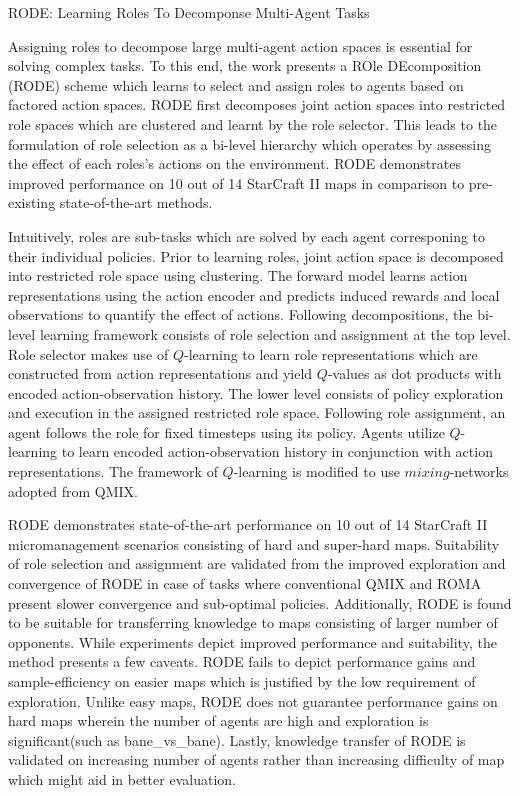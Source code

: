\documentclass[11pt,letterpaper]{article}
\begin{document}
\begin{center}
  \large{RODE: Learning Roles To Decomponse Multi-Agent Tasks}
\end{center}

Assigning roles to decompose large multi-agent action spaces is essential for solving complex tasks. To this end, the work presents a ROle DEcomposition (RODE) scheme which learns to select and assign roles to agents based on factored action spaces. RODE first decomposes joint action spaces into restricted role spaces which are clustered and learnt by the role selector. This leads to the formulation of role selection as a bi-level hierarchy which operates by assessing the effect of each roles's actions on the environment. RODE demonstrates improved performance on 10 out of 14 StarCraft II maps in comparison to pre-existing state-of-the-art methods.  

Intuitively, roles are sub-tasks which are solved by each agent corresponing to their individual policies. Prior to learning roles, joint action space is decomposed into restricted role space using clustering. The forward model learns action representations using the action encoder and predicts induced rewards and local observations to quantify the effect of actions. Following decompositions, the bi-level learning framework consists of role selection and assignment at the top level. Role selector makes use of $Q$-learning to learn role representations which are constructed from action representations and yield $Q$-values as dot products with encoded action-observation history. The lower level consists of policy exploration and execution in the assigned restricted role space. Following role assignment, an agent follows the role for fixed timesteps using its policy. Agents utilize $Q$-learning to learn encoded action-observation history in conjunction with action representations. The framework of $Q$-learning is modified to use $mixing$-networks adopted from QMIX.

RODE demonstrates state-of-the-art performance on 10 out of 14 StarCraft II micromanagement scenarios consisting of hard and super-hard maps. Suitability of role selection and assignment are validated from the improved exploration and convergence of RODE in case of tasks where conventional QMIX and ROMA present slower convergence and sub-optimal policies. Additionally, RODE is found to be suitable for transferring knowledge to maps consisting of larger number of opponents. While experiments depict improved performance and suitability, the method presents a few caveats. RODE fails to depict performance gains and sample-efficiency on easier maps which is justified by the low requirement of exploration. Unlike easy maps, RODE does not guarantee performance gains on hard maps wherein the number of agents are high and exploration is significant(such as bane\_vs\_bane). Lastly, knowledge transfer of RODE is validated on increasing number of agents rather than increasing difficulty of map which might aid in better evaluation.
\end{document}
